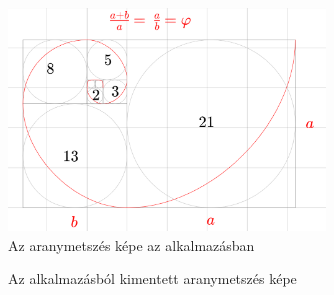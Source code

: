 \begin{figure}[!h]
	\label{fig:gr_editor}
	\centering
	\includegraphics[width=0.75\textwidth]{images/goldenratio.png}
	\caption{Az aranymetszés képe az alkalmazásban}
\end{figure}

\begin{figure}[!h]
	\label{fig:gr_tikz}
	\centering
	\scalebox{1.4}{}
	\caption{Az alkalmazásból kimentett aranymetszés képe}
\end{figure}
